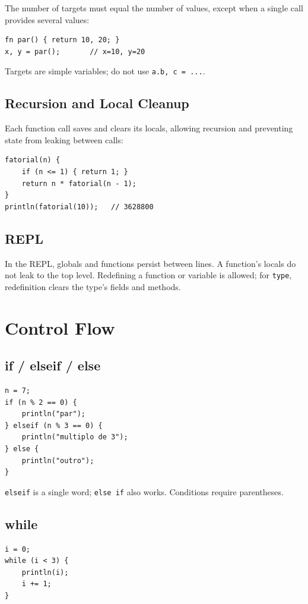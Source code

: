 \documentclass[11pt,a4paper,oneside]{report}
\newcommand{\code}[1]{\texttt{#1}}
\begin{document}
The number of targets must equal the number of values, except when a
single call provides several values:
\begin{lstlisting}
fn par() { return 10, 20; }
x, y = par();       // x=10, y=20
\end{lstlisting}

Targets are simple variables; do not use \code{a.b, c = ...}.

\section{Recursion and Local Cleanup}
Each function call saves and clears its locals, allowing recursion and
preventing state from leaking between calls:

\begin{lstlisting}
fatorial(n) {
    if (n <= 1) { return 1; }
    return n * fatorial(n - 1);
}
println(fatorial(10));   // 3628800
\end{lstlisting}

\section{REPL}
In the REPL, globals and functions persist between lines. A function's
locals do not leak to the top level. Redefining a function or variable is
allowed; for \code{type}, redefinition clears the type's fields and
methods.

\chapter{Control Flow}
\label{cap:controle}

\section{if / elseif / else}
\begin{lstlisting}
n = 7;
if (n % 2 == 0) {
    println("par");
} elseif (n % 3 == 0) {
    println("multiplo de 3");
} else {
    println("outro");
}
\end{lstlisting}

\code{elseif} is a single word; \code{else if} also works. Conditions
require parentheses.

\section{while}
\begin{lstlisting}
i = 0;
while (i < 3) {
    println(i);
    i += 1;
}
\end{lstlisting}
\end{document}
